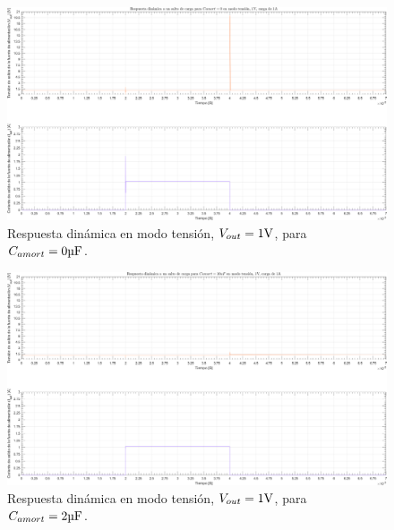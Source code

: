 \clearpage

\begin{figure}[H] %
\begin{center}
\includegraphics[width=1.1 \textwidth, angle=90]{./img/plots/dynamic/power_supply_CAMORT_0_STEP_Modo2.png}
\caption{\label{fig:fig_power_supply_CAMORT_STEP_0_Modo2}\footnotesize{Respuesta dinámica en modo tensión, $V_{out} = 1 \si[per-mode=symbol]{\volt}$, para $C_{amort} = 0 \si[per-mode=symbol]{\micro\farad} $.}}
\end{center}
\end{figure}

\clearpage

\begin{figure}[H] %
\begin{center}
\includegraphics[width=1.1 \textwidth, angle=90]{./img/plots/dynamic/power_supply_CAMORT_10u_STEP_Modo2.png}
\caption{\label{fig:fig_power_supply_CAMORT_STEP_10u_Modo2}\footnotesize{Respuesta dinámica en modo tensión, $V_{out} = 1 \si[per-mode=symbol]{\volt}$, para $C_{amort} = 2 \si[per-mode=symbol]{\micro\farad} $.}}
\end{center}
\end{figure}

